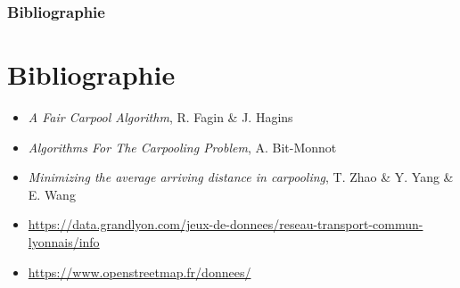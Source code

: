\documentclass{beamer}
\begin{document}
\begin{frame}
  \frametitle{Bibliographie}
  \section{Bibliographie}
  \begin{itemize}
    \item \textit{A Fair Carpool Algorithm}, R. Fagin \& J. Hagins
    \item \textit{Algorithms For The Carpooling Problem}, A. Bit-Monnot

    \item \textit{Minimizing the average arriving distance in carpooling},
          T. Zhao \& Y. Yang \& E. Wang

    \item \url{https://data.grandlyon.com/jeux-de-donnees/reseau-transport-commun-lyonnais/info}
    \item \url{https://www.openstreetmap.fr/donnees/}
  \end{itemize}
\end{frame}





\end{document}
